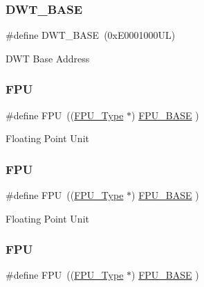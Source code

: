\subsubsection{\texorpdfstring{D\+W\+T\+\_\+\+B\+A\+SE}{DWT\_BASE}\hspace{0.1cm}{\footnotesize\ttfamily [8/8]}}
{\footnotesize\ttfamily \#define D\+W\+T\+\_\+\+B\+A\+SE~(0x\+E0001000\+U\+L)}

D\+WT Base Address \mbox{\label{group___c_m_s_i_s__core__base_gabc7c93f2594e85ece1e1a24f10591428}} 
\subsubsection{\texorpdfstring{F\+PU}{FPU}\hspace{0.1cm}{\footnotesize\ttfamily [1/4]}}
{\footnotesize\ttfamily \#define F\+PU~((\hyperlink{struct_f_p_u___type}{F\+P\+U\+\_\+\+Type}       $\ast$)     \hyperlink{group___c_m_s_i_s__core__base_ga4dcad4027118c098c07bcd575f1fbb28}{F\+P\+U\+\_\+\+B\+A\+SE}      )}

Floating Point Unit \mbox{\label{group___c_m_s_i_s__core__base_gabc7c93f2594e85ece1e1a24f10591428}} 
\subsubsection{\texorpdfstring{F\+PU}{FPU}\hspace{0.1cm}{\footnotesize\ttfamily [2/4]}}
{\footnotesize\ttfamily \#define F\+PU~((\hyperlink{struct_f_p_u___type}{F\+P\+U\+\_\+\+Type}       $\ast$)     \hyperlink{group___c_m_s_i_s__core__base_ga4dcad4027118c098c07bcd575f1fbb28}{F\+P\+U\+\_\+\+B\+A\+SE}      )}

Floating Point Unit \mbox{\label{group___c_m_s_i_s__core__base_gabc7c93f2594e85ece1e1a24f10591428}} 
\subsubsection{\texorpdfstring{F\+PU}{FPU}\hspace{0.1cm}{\footnotesize\ttfamily [3/4]}}
{\footnotesize\ttfamily \#define F\+PU~((\hyperlink{struct_f_p_u___type}{F\+P\+U\+\_\+\+Type}       $\ast$)     \hyperlink{group___c_m_s_i_s__core__base_ga4dcad4027118c098c07bcd575f1fbb28}{F\+P\+U\+\_\+\+B\+A\+SE}         )}

